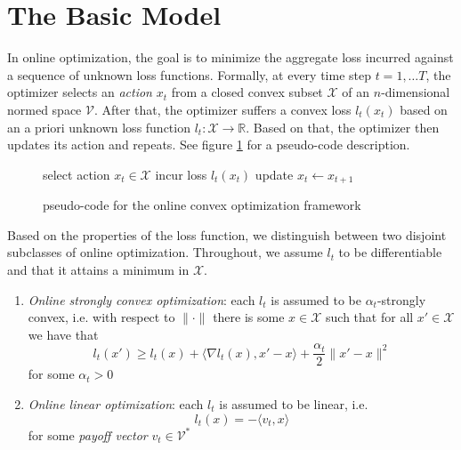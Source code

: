 \section{The Basic Model}\label{section:theBasicModel}

In online optimization, the goal is to minimize the aggregate loss incurred against a sequence of unknown loss functions. Formally, at every time step $t = 1, \dots T$, the optimizer selects an \textit{action} $x_t$ from a closed convex subset $\mathcal{X}$ of an $n$-dimensional normed space $\mathcal{V}$. After that, the optimizer suffers a convex loss $l_t(x_t)$ based on an a priori unknown loss function $l_t:\mathcal{X} \to \mathbb{R}$. Based on that, the optimizer then updates its action and repeats. See figure \ref{fig:OCO} for a pseudo-code description.

\begin{figure}[H]\centering
    \begin{minipage}{.9\linewidth}
        \begin{algorithm}[H]
        \DontPrintSemicolon
         {
        select action $x_t \in \mathcal{X}$ \;
        incur loss $l_t(x_t)$ \;
        update $x_t \gets x_{t+1}$ \;
        }
        \end{algorithm}\caption{pseudo-code for the online convex optimization framework}  \label{fig:OCO}
  \end{minipage}
\end{figure}

Based on the properties of the loss function, we distinguish between two disjoint subclasses of online optimization. Throughout, we assume $l_t$ to be differentiable and that it attains a minimum in $\mathcal{X}$.

\begin{enumerate}
    \item\label{item:stronglyOptimization} \textit{Online strongly convex optimization}: each $l_t$ is assumed to be $\alpha_t$-strongly convex, i.e. with respect to $\|\cdot\|$ there is some $x \in \mathcal{X}$ such that for all $x' \in \mathcal{X}$  we have that 
    \begin{equation}\label{equ:stronglyOptimization}
        l_t(x') \ge l_t(x) + \langle \nabla l_t(x),x'-x\rangle + \frac{\alpha_t}{2}\|x'-x\|^2
    \end{equation}
    for some $\alpha_t > 0$
    \item \textit{Online linear optimization}: each $l_t$ is assumed to be linear, i.e. 
    \begin{equation}\label{equ:linaerOptimization}
        l_t(x) = -\langle v_t,x\rangle
    \end{equation}
    for some \textit{payoff vector} $v_t \in \mathcal{V}^*$
\end{enumerate}

